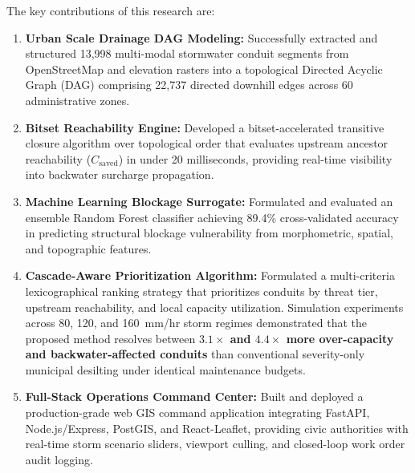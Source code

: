 \documentclass[12pt,a4paper]{report}
\begin{document}
The key contributions of this research are:
\begin{enumerate}
    \item \textbf{Urban Scale Drainage DAG Modeling:} Successfully extracted and structured 13,998 multi-modal stormwater conduit segments from OpenStreetMap and elevation rasters into a topological Directed Acyclic Graph (DAG) comprising 22,737 directed downhill edges across 60 administrative zones.
    \item \textbf{Bitset Reachability Engine:} Developed a bitset-accelerated transitive closure algorithm over topological order that evaluates upstream ancestor reachability ($C_{\text{saved}}$) in under 20 milliseconds, providing real-time visibility into backwater surcharge propagation.
    \item \textbf{Machine Learning Blockage Surrogate:} Formulated and evaluated an ensemble Random Forest classifier achieving 89.4\% cross-validated accuracy in predicting structural blockage vulnerability from morphometric, spatial, and topographic features.
    \item \textbf{Cascade-Aware Prioritization Algorithm:} Formulated a multi-criteria lexicographical ranking strategy that prioritizes conduits by threat tier, upstream reachability, and local capacity utilization. Simulation experiments across 80, 120, and 160~mm/hr storm regimes demonstrated that the proposed method resolves between \textbf{$3.1\times$ and $4.4\times$ more over-capacity and backwater-affected conduits} than conventional severity-only municipal desilting under identical maintenance budgets.
    \item \textbf{Full-Stack Operations Command Center:} Built and deployed a production-grade web GIS command application integrating FastAPI, Node.js/Express, PostGIS, and React-Leaflet, providing civic authorities with real-time storm scenario sliders, viewport culling, and closed-loop work order audit logging.
\end{enumerate}
\end{document}
